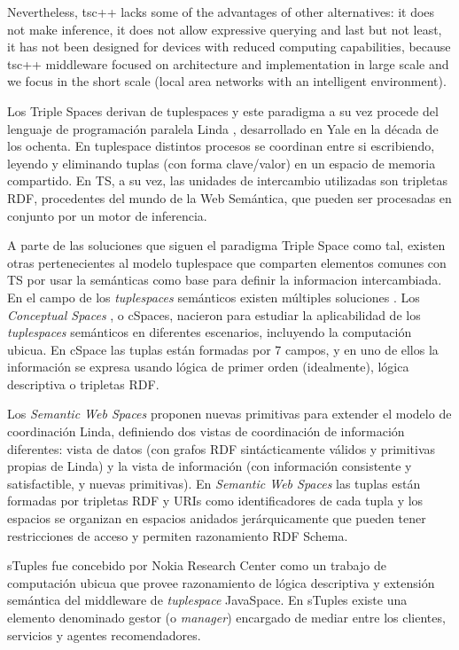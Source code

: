 Nevertheless, tsc++ lacks some of the advantages of other alternatives: it does not make inference, it does not allow expressive querying
and last but not least, it has not been designed for devices with reduced computing capabilities, because tsc++ middleware focused on
architecture and implementation in large scale and we focus in the short scale (local area networks with an intelligent environment).

Los Triple Spaces derivan de tuplespaces y este paradigma a su vez procede del lenguaje de programación paralela Linda \cite{gelernter_generative_1985}, desarrollado en Yale en la década de los ochenta. En tuplespace distintos procesos se coordinan entre si escribiendo, leyendo y eliminando tuplas (con forma clave/valor) en un espacio de memoria compartido. En TS, a su vez, las unidades de intercambio utilizadas son tripletas RDF, procedentes del mundo de la Web Semántica, que pueden ser procesadas en conjunto por un motor de inferencia.

A parte de las soluciones que siguen el paradigma Triple Space como tal, existen otras pertenecientes al modelo tuplespace que comparten elementos comunes con TS por usar la semánticas como base para definir la informacion intercambiada. En el campo de los \textit{tuplespaces} semánticos existen múltiples soluciones \cite{nixon_tuplespace-based_2008}. Los \textit{Conceptual Spaces} \cite{martin-recuerda_towards_2005}, o cSpaces, nacieron para estudiar la aplicabilidad de los \textit{tuplespaces} semánticos en diferentes escenarios, incluyendo la computación ubicua.
En cSpace las tuplas están formadas por 7 campos, y en uno de ellos la información se expresa usando lógica de primer orden (idealmente), lógica descriptiva o tripletas RDF.

Los \textit{Semantic Web Spaces} \cite{tolksdorf_coordination_2006,tolksdorf_towards_2008} proponen nuevas primitivas para extender el modelo de coordinación Linda, definiendo dos vistas de coordinación de información diferentes: vista de datos (con grafos RDF sintácticamente válidos y primitivas propias de Linda) y la vista de información (con información consistente y satisfactible, y nuevas primitivas). En \textit{Semantic Web Spaces} las tuplas están formadas por tripletas RDF y URIs como identificadores de cada tupla y los espacios se organizan en espacios anidados jerárquicamente que pueden tener restricciones de acceso y permiten razonamiento RDF Schema.

sTuples \cite{khushraj_stuples:_2004} fue concebido por Nokia Research Center como un trabajo de computación ubicua que provee razonamiento de lógica descriptiva y extensión semántica del middleware de \textit{tuplespace} JavaSpace. En sTuples existe una elemento denominado gestor (o \textit{manager}) encargado de mediar entre los clientes, servicios y agentes recomendadores.

